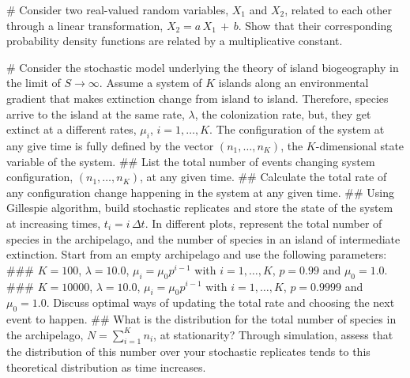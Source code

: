 \documentclass{article}
\newenvironment{problem}[2][Problem]{\begin{trivlist}
\item[\hskip \labelsep {\bfseries #1}\hskip \labelsep {\bfseries #2.}]}{\end{trivlist}}
\begin{document}
\begin{easylist}[enumerate]
# Consider two real-valued random variables, $X_1$ and $X_2$, related to each other through a linear transformation, $X_2 = a\,X_1\,+\,b$. Show that their corresponding probability density functions are related by a multiplicative constant.  

# Consider the stochastic model underlying the theory of island biogeography in the limit of  $S \rightarrow \infty$. Assume a system of $K$ islands along an environmental gradient that makes extinction change from island to island. Therefore, species arrive to the island at the same rate, $\lambda$, the colonization rate, but, they get extinct at a different rates, $\mu_i$, $i=1, \dots, K$. The configuration of the system at any give time is fully defined by the vector $(n_1, \dots, n_K)$, the $K$-dimensional state variable of the system.
## List the total number of events changing system configuration, $(n_1, \dots, n_K)$, at any given time. 
## Calculate the total rate of any configuration change happening in the system at any given time. 
## Using Gillespie algorithm, build stochastic replicates and store the state of the system at increasing times, $t_i= i\,\Delta t$. In different plots, represent the total number of species in the archipelago, and the number of species in an island of intermediate extinction. Start from an empty archipelago and use the following parameters:
### $K=100$, $\lambda = 10.0$, $\mu_i = \mu_0 p^{i-1}$ with $i=1, \dots, K$, $p = 0.99$ and $\mu_0 = 1.0$.
### $K=10000$, $\lambda = 10.0$, $\mu_i = \mu_0 p^{i-1}$ with $i=1, \dots, K$, $p = 0.9999$ and $\mu_0 = 1.0$. Discuss optimal ways of updating the total rate and choosing the next event to happen. 
## What is the distribution for the total number of species in the archipelago, $N = \sum_{i=1}^K n_i$, at stationarity? Through simulation, assess that the distribution of this number over your stochastic replicates tends to this theoretical distribution as time increases.  
\end{easylist}


\end{document}
